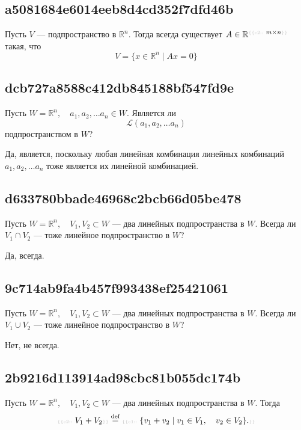 \documentclass[11pt, a5paper]{article}
\newenvironment{note}[1]{\goodbreak\par\subsection{\hfill \color{lightgray}\tiny #1}}{}
\newenvironment{cloze}[2][\ldots]{\begin{leftbar}}{\end{leftbar}}
\newenvironment{icloze}[2][\ldots]{%
  \ignorespaces\text{\tiny \color{lightgray} \{\{c#2:: }%
}{%
  \text{\tiny \color{lightgray}\}\}}\unskip%
}
\begin{document}
\begin{note}{a5081684e6014eeb8d4cd352f7dfd46b}
    Пусть \( V \) --- подпространство в \( \mathbb R ^{n}. \) Тогда всегда существует \( A \in \mathbb R ^{\begin{icloze}{2}m \times n\end{icloze}}  \) такая, что
    \begin{icloze}{1}\[
        V = \{ x \in \mathbb R ^{n}  \mid Ax = 0  \}
    \]\end{icloze}
\end{note}

\begin{note}{dcb727a8588c412db845188bf547fd9e}
    Пусть \( W = \mathbb R ^{n}, \quad a_1, a_2, \ldots a_n \in W. \) Является ли
    \[
        \mathscr L (a_1, a_2, \ldots a_n)
    \]
    подпространством в \( W \)?

    \begin{cloze}{1}
        Да, является, поскольку любая линейная комбинация линейных комбинаций \( a_1, a_2, \ldots a_n  \)  тоже является их линейной комбинацией.
    \end{cloze}
\end{note}

\begin{note}{d633780bbade46968c2bcb66d05be478}
    Пусть \( W = \mathbb R ^{n}, \quad V_1, V_2 \subset W \) --- два линейных подпространства в \( W. \)
    Всегда ли \( V_1 \cap V_2 \) --- тоже линейное подпространство в \( W \)?

    \begin{cloze}{1}
        Да, всегда.
    \end{cloze}
\end{note}

\begin{note}{9c714ab9fa4b457f993438ef25421061}
    Пусть \( W = \mathbb R ^{n}, \quad V_1, V_2 \subset W \) --- два линейных подпространства в \( W. \)
    Всегда ли \( V_1 \cup V_2 \) --- тоже линейное подпространство в \( W \)?

    \begin{cloze}{1}
        Нет, не всегда.
    \end{cloze}
\end{note}

\begin{note}{2b9216d113914ad98cbc81b055dc174b}
    Пусть \( W = \mathbb R ^{n}, \quad V_1, V_2 \subset W \) --- два линейных подпространства в \( W. \)
    Тогда
    \[
        \begin{icloze}{2}V_1 + V_2\end{icloze} \overset{\text{def}}= \begin{icloze}{1}
            \{ v_1 + v_2 \mid v_1 \in V_1, \quad v_2 \in V_2 \} .
        \end{icloze}
    \]
\end{note}
\end{document}
